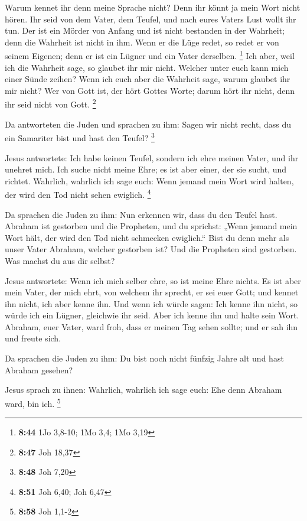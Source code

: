 Warum kennet ihr denn meine Sprache nicht? Denn ihr könnt
ja mein Wort nicht hören.  Ihr seid von dem Vater, dem
Teufel, und nach eures Vaters Lust wollt ihr tun. Der ist ein Mörder von
Anfang und ist nicht bestanden in der Wahrheit; denn die Wahrheit ist
nicht in ihm. Wenn er die Lüge redet, so redet er von seinem Eigenen;
denn er ist ein Lügner und ein Vater derselben. \footnote{\textbf{8:44}
  1Jo 3,8-10; 1Mo 3,4; 1Mo 3,19}  Ich aber, weil ich die
Wahrheit sage, so glaubet ihr mir nicht.  Welcher unter
euch kann mich einer Sünde zeihen? Wenn ich euch aber die Wahrheit sage,
warum glaubet ihr mir nicht?  Wer von Gott ist, der hört
Gottes Worte; darum hört ihr nicht, denn ihr seid nicht von Gott.
\footnote{\textbf{8:47} Joh 18,37}

 Da antworteten die Juden und sprachen zu ihm: Sagen wir
nicht recht, dass du ein Samariter bist und hast den Teufel? \footnote{\textbf{8:48}
  Joh 7,20}

 Jesus antwortete: Ich habe keinen Teufel, sondern ich ehre
meinen Vater, und ihr unehret mich.  Ich suche nicht meine
Ehre; es ist aber einer, der sie sucht, und richtet. 
Wahrlich, wahrlich ich sage euch: Wenn jemand mein Wort wird halten, der
wird den Tod nicht sehen ewiglich. \footnote{\textbf{8:51} Joh 6,40; Joh
  6,47}

 Da sprachen die Juden zu ihm: Nun erkennen wir, dass du
den Teufel hast. Abraham ist gestorben und die Propheten, und du
sprichst: „Wenn jemand mein Wort hält, der wird den Tod nicht schmecken
ewiglich.``  Bist du denn mehr als unser Vater Abraham,
welcher gestorben ist? Und die Propheten sind gestorben. Was machst du
aus dir selbst?

 Jesus antwortete: Wenn ich mich selber ehre, so ist meine
Ehre nichts. Es ist aber mein Vater, der mich ehrt, von welchem ihr
sprecht, er sei euer Gott;  und kennet ihn nicht, ich aber
kenne ihn. Und wenn ich würde sagen: Ich kenne ihn nicht, so würde ich
ein Lügner, gleichwie ihr seid. Aber ich kenne ihn und halte sein Wort.
 Abraham, euer Vater, ward froh, dass er meinen Tag sehen
sollte; und er sah ihn und freute sich.

 Da sprachen die Juden zu ihm: Du bist noch nicht fünfzig
Jahre alt und hast Abraham gesehen?

 Jesus sprach zu ihnen: Wahrlich, wahrlich ich sage euch:
Ehe denn Abraham ward, bin ich. \footnote{\textbf{8:58} Joh 1,1-2}

